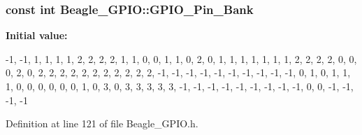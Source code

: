\hypertarget{class_beagle___g_p_i_o_ae7919c981429a17c48c601664a61d64a}{
\subsubsection[{\-G\-P\-I\-O\-\_\-\-Pin\-\_\-\-Bank}]{\setlength{\rightskip}{0pt plus 5cm}const int {\bf \-Beagle\-\_\-\-G\-P\-I\-O\-::\-G\-P\-I\-O\-\_\-\-Pin\-\_\-\-Bank}}}\label{class_beagle___g_p_i_o_ae7919c981429a17c48c601664a61d64a}
{\bfseries \-Initial value\-:}
\begin{DoxyCode}
 
{
        -1, -1,  1,  1,  1,     
         1,  2,  2,  2,  2,     
         1,  1,  0,  0,  1,     
         1,  0,  2,  0,  1,     
         1,  1,  1,  1,  1,     
         1,  2,  2,  2,  2,     
         0,  0,  0,  2,  0,     
         2,  2,  2,  2,  2,     
         2,  2,  2,  2,  2,     
         2,                     
        -1, -1, -1, -1, -1,     
        -1, -1, -1, -1, -1,     
         0,  1,  0,  1,  1,     
         1,  0,  0,  0,  0,     
         0,  0,  1,  0,  3,     
         0,  3,  3,  3,  3,     
         3, -1, -1, -1, -1,     
        -1, -1, -1, -1, -1,     
         0,  0, -1, -1, -1,     
        -1                      
}
\end{DoxyCode}


\-Definition at line 121 of file \-Beagle\-\_\-\-G\-P\-I\-O.\-h.

